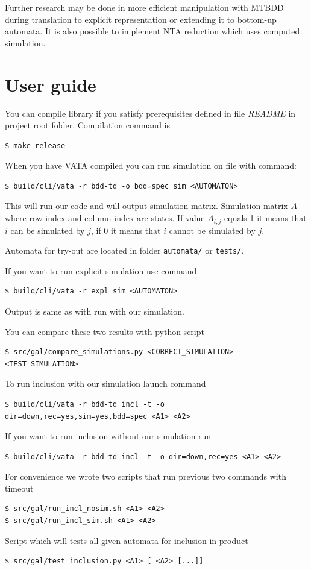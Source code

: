 \documentclass[a4paper, 12pt]{article}
\begin{document}
Further research may be done in more efficient manipulation with MTBDD during translation to explicit representation or
extending it to bottom-up automata.
It is also possible to implement NTA reduction which uses computed simulation.

\newpage
\appendix
\section{User guide}
\label{app:usage}

You can compile library if you satisfy prerequisites defined in file \textit{README} in project root folder. Compilation command is
\begin{verbatim}
$ make release
\end{verbatim}

When you have VATA compiled you can run simulation on file with command:
\begin{verbatim}
$ build/cli/vata -r bdd-td -o bdd=spec sim <AUTOMATON>
\end{verbatim}
This will run our code and will output simulation matrix. Simulation matrix $A$ where row index and column index are states. If value $A_{i,j}$ equals 1 it means that $i$ can be simulated by $j$, if 0 it means that $i$ cannot be simulated by $j$.

Automata for try-out are located in folder \texttt{automata/} or \texttt{tests/}.

If you want to run explicit simulation use command
\begin{verbatim}
$ build/cli/vata -r expl sim <AUTOMATON>
\end{verbatim}
Output is same as with run with our simulation.

You can compare these two results with python script
\begin{verbatim}
$ src/gal/compare_simulations.py <CORRECT_SIMULATION> <TEST_SIMULATION>
\end{verbatim}

To run inclusion with our simulation launch command
\begin{verbatim}
$ build/cli/vata -r bdd-td incl -t -o dir=down,rec=yes,sim=yes,bdd=spec <A1> <A2>
\end{verbatim}

If you want to run inclusion without our simulation run
\begin{verbatim}
$ build/cli/vata -r bdd-td incl -t -o dir=down,rec=yes <A1> <A2>
\end{verbatim}

For convenience we wrote two scripts that run previous two commands with timeout
\begin{verbatim}
$ src/gal/run_incl_nosim.sh <A1> <A2> 
$ src/gal/run_incl_sim.sh <A1> <A2>
\end{verbatim}

Script which will tests all given automata for inclusion in product
\begin{verbatim}
$ src/gal/test_inclusion.py <A1> [ <A2> [...]]
\end{verbatim}

\newpage
 


\end{document}
